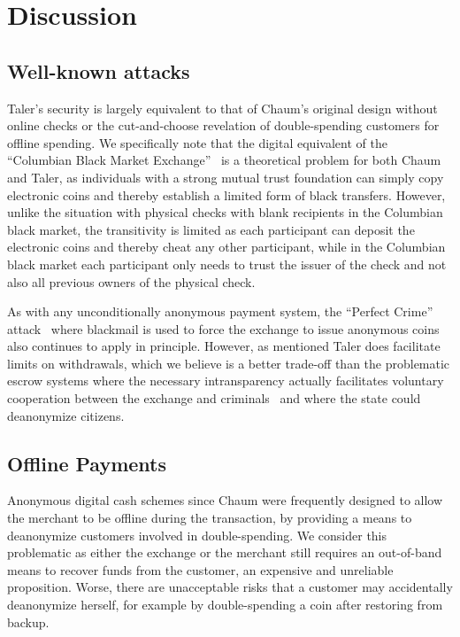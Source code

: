 \documentclass[sigconf, authordraft]{acmart}
\begin{document}
\section{Discussion}

\subsection{Well-known attacks}

Taler's security is largely equivalent to that of Chaum's original
design without online checks or the cut-and-choose revelation of
double-spending customers for offline spending.
We specifically note that the digital equivalent of the ``Columbian
Black Market Exchange''~\cite{fatf1997} is a theoretical problem for
both Chaum and Taler, as individuals with a strong mutual trust
foundation can simply copy electronic coins and thereby establish a
limited form of black transfers.  However, unlike the situation with
physical checks with blank recipients in the Columbian black market,
the transitivity is limited as each participant can deposit the electronic
coins and thereby cheat any other participant, while in the Columbian
black market each participant only needs to trust the issuer of the
check and not also all previous owners of the physical check.

As with any unconditionally anonymous payment system, the ``Perfect
Crime'' attack~\cite{solms1992perfect} where blackmail is used to
force the exchange to issue anonymous coins also continues to apply in
principle.  However, as mentioned Taler does facilitate limits on
withdrawals, which we believe is a better trade-off than the
problematic escrow systems where the necessary intransparency
actually facilitates voluntary cooperation between the exchange and
criminals~\cite{sander1999escrow} and where the state could
deanonymize citizens.

\subsection{Offline Payments} \label{sec:offline}

Anonymous digital cash schemes since Chaum were frequently designed
to allow the merchant to be offline during the transaction,
by providing a means to deanonymize customers involved in
double-spending.  We consider this problematic as either the
exchange or the merchant still requires an out-of-band
means to recover funds from the customer, an expensive and
unreliable proposition.  Worse, there are unacceptable risks that
a customer may accidentally deanonymize herself, for example by
double-spending a coin after restoring from backup.
\end{document}
